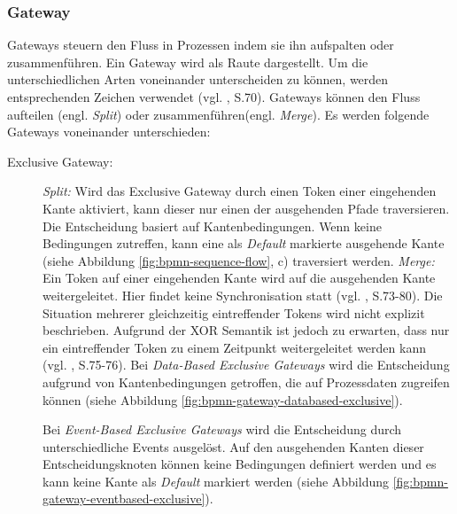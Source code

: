 

\subsubsection{Gateway}
Gateways steuern den Fluss in Prozessen indem sie ihn aufspalten oder zusammenführen. Ein Gateway wird als Raute dargestellt. Um die unterschiedlichen Arten voneinander unterscheiden zu können, werden entsprechenden Zeichen verwendet (vgl. \citep{BPMN2009}, S.70). Gateways können den Fluss aufteilen (engl. \emph{Split}) oder zusammenführen(engl.  \emph{Merge}). Es werden folgende Gateways voneinander unterschieden:
\begin{description}
\item[Exclusive Gateway:] \emph{Split:} Wird das Exclusive Gateway durch einen Token einer eingehenden Kante aktiviert, kann dieser nur einen der ausgehenden Pfade traversieren. Die Entscheidung basiert auf  Kantenbedingungen. Wenn keine Bedingungen zutreffen, kann eine als \emph{Default} markierte ausgehende Kante (siehe Abbildung \ref{fig:bpmn-sequence-flow}, c) traversiert werden. \emph{Merge:} Ein Token auf einer eingehenden Kante wird auf die ausgehenden Kante weitergeleitet. Hier findet keine Synchronisation statt (vgl. \citep{BPMN2009}, S.73-80). Die Situation mehrerer gleichzeitig eintreffender Tokens wird nicht explizit beschrieben. Aufgrund der XOR Semantik ist jedoch zu erwarten, dass nur ein eintreffender Token zu einem Zeitpunkt weitergeleitet werden kann (vgl. \citep{BPMN2009}, S.75-76).
Bei \emph{Data-Based Exclusive Gateways} wird die Entscheidung aufgrund von Kantenbedingungen getroffen, die auf Prozessdaten zugreifen können (siehe Abbildung \ref{fig:bpmn-gateway-databased-exclusive}).

Bei \emph{Event-Based Exclusive Gateways} wird die Entscheidung durch unterschiedliche Events ausgelöst. Auf den ausgehenden Kanten dieser Entscheidungsknoten können keine Bedingungen definiert werden und es kann keine Kante als \emph{Default} markiert werden (siehe Abbildung \ref{fig:bpmn-gateway-eventbased-exclusive}).


\end{description}
